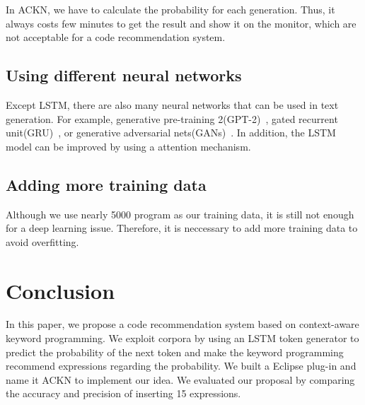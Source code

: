 \documentclass[PRO,english]{ipsj}
\begin{document}
In ACKN, we have to calculate the probability for each generation. Thus, it always costs few minutes to get the result and show it on the monitor, which are not acceptable for a code recommendation system. 

\subsection{Using different neural networks}
Except LSTM, there are also many neural networks that can be used in text generation. For example, generative pre-training 2(GPT-2)~\cite{radford2019language}, gated recurrent unit(GRU)~\cite{cho2014learning}, or generative adversarial nets(GANs)~\cite{goodfellow2014generative}. In addition, the LSTM model can be improved by using a attention mechanism. 

\subsection{Adding more training data}
Although we use nearly 5000 program as our training data, it is still not enough for a deep learning issue. Therefore, it is neccessary to add more training data to avoid overfitting.

\section{Conclusion}

In this paper, we propose a code recommendation system based on context-aware keyword programming. We exploit corpora by using an LSTM token generator to predict the probability of the next token and make the keyword programming recommend expressions regarding the probability. We built a Eclipse plug-in and name it ACKN to implement our idea. We evaluated our proposal by comparing the accuracy and precision of inserting 15 expressions. 




\end{document}
